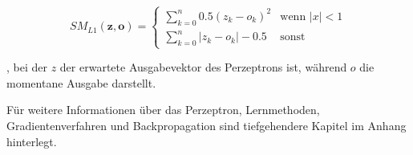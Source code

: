\begin{equation} \label{smooth}
SM_{L1}(\boldsymbol{z},\boldsymbol{o}) = \begin{cases}
\sum_{k=0}^n 0.5(z_k-o_k)^2      & \text{wenn } |x| < 1\\
\sum_{k=0}^n |z_k-o_k| - 0.5   & \text{sonst}
\end{cases}
\end{equation}

, bei der $z$ der erwartete Ausgabevektor des Perzeptrons ist, während $o$ die momentane Ausgabe darstellt.

Für weitere Informationen über das Perzeptron, Lernmethoden, Gradientenverfahren und Backpropagation sind tiefgehendere Kapitel im Anhang hinterlegt.

